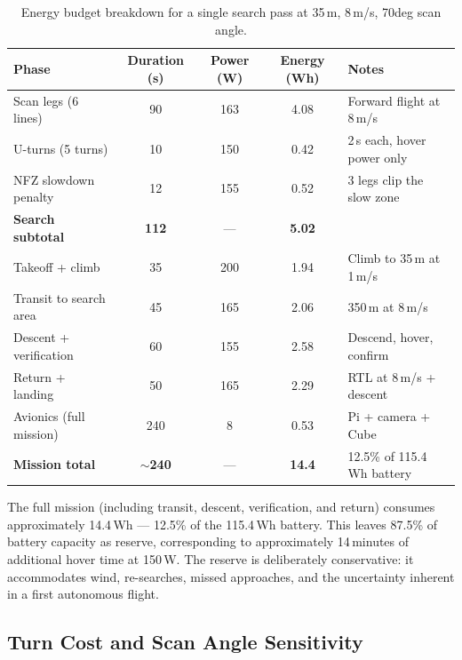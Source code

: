 \documentclass[10pt,a4paper]{article}
\def\textdegree{deg}%
\newcommand{\compactTable}{\small\setlength{\tabcolsep}{3pt}\renewcommand{\arraystretch}{1.05}}
\begin{document}
\begin{table}[H]
  \centering\compactTable
  \caption{Energy budget breakdown for a single search pass at 35\,m, 8\,m/s, 70\textdegree{} scan angle.}\label{tab:energy-budget}
  \begin{tabularx}{\linewidth}{@{}l c c c X@{}}
    \toprule
    \textbf{Phase} & \textbf{Duration (s)} & \textbf{Power (W)} & \textbf{Energy (Wh)} & \textbf{Notes} \\
    \midrule
    Scan legs (6 lines)      & 90   & 163  & 4.08  & Forward flight at 8\,m/s \\
    U-turns (5 turns)        & 10   & 150  & 0.42  & 2\,s each, hover power only \\
    NFZ slowdown penalty     & 12   & 155  & 0.52  & 3 legs clip the slow zone \\
    \midrule
    \textbf{Search subtotal} & \textbf{112} & --- & \textbf{5.02} & \\
    \midrule
    Takeoff + climb          & 35   & 200  & 1.94  & Climb to 35\,m at 1\,m/s \\
    Transit to search area   & 45   & 165  & 2.06  & 350\,m at 8\,m/s \\
    Descent + verification   & 60   & 155  & 2.58  & Descend, hover, confirm \\
    Return + landing         & 50   & 165  & 2.29  & RTL at 8\,m/s + descent \\
    Avionics (full mission)  & 240  & 8    & 0.53  & Pi + camera + Cube \\
    \midrule
    \textbf{Mission total}   & \textbf{$\sim$240} & --- & \textbf{14.4} & 12.5\% of 115.4\,Wh battery \\
    \bottomrule
  \end{tabularx}
\end{table}

The full mission (including transit, descent, verification, and return) consumes approximately 14.4\,Wh --- 12.5\% of the 115.4\,Wh battery. This leaves 87.5\% of battery capacity as reserve, corresponding to approximately 14\,minutes of additional hover time at 150\,W. The reserve is deliberately conservative: it accommodates wind, re-searches, missed approaches, and the uncertainty inherent in a first autonomous flight.

\subsection{Turn Cost and Scan Angle Sensitivity}
\end{document}
